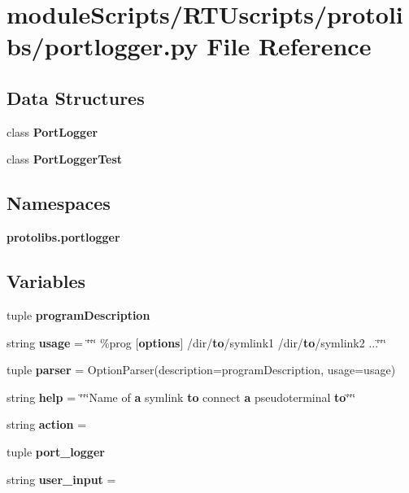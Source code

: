 \section{module\+Scripts/\+R\+T\+Uscripts/protolibs/portlogger.py File Reference}
\label{portlogger_8py}
\subsection*{Data Structures}
\begin{DoxyCompactItemize}
\item 
class {\bf Port\+Logger}
\item 
class {\bf Port\+Logger\+Test}
\end{DoxyCompactItemize}
\subsection*{Namespaces}
\begin{DoxyCompactItemize}
\item 
 {\bf protolibs.\+portlogger}
\end{DoxyCompactItemize}
\subsection*{Variables}
\begin{DoxyCompactItemize}
\item 
tuple {\bf program\+Description}
\item 
string {\bf usage} = \char`\"{}\char`\"{}\char`\"{} \%prog [{\bf options}] /dir/{\bf to}/symlink1 /dir/{\bf to}/symlink2 ...\char`\"{}\char`\"{}\char`\"{}
\item 
tuple {\bf parser} = Option\+Parser(description=program\+Description, usage=usage)
\item 
string {\bf help} = \char`\"{}\char`\"{}\char`\"{}Name of {\bf a} symlink {\bf to} connect {\bf a} pseudoterminal {\bf to}\char`\"{}\char`\"{}\char`\"{}
\item 
string {\bf action} = \textquotesingle{}
\item 
tuple {\bf port\+\_\+logger}
\item 
string {\bf user\+\_\+input} = \textquotesingle{}\textquotesingle{}
\end{DoxyCompactItemize}

